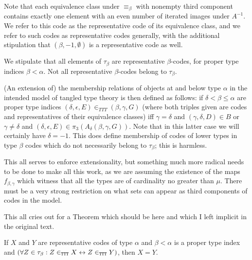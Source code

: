 \begin{definition}
\label {def:representative-code}

Note that each equivalence class under $\equiv_\beta$ with nonempty third component contains exactly one
element with an even number of iterated images under $A^{-1}$.  We refer to this code as the representative code of its equivalence class, and we refer to such codes as representative codes generally, with the additional stipulation
that $(\beta,-1,\emptyset)$ is a representative code as well.
\end{definition}

\begin{lemma}
\label {objects-are-representative}
We stipulate that all elements of $\tau_\beta$ are representative $\beta$-codes, for proper type indices $\beta<\alpha$.
Not all representative $\beta$-codes belong to $\tau_\beta$.
\end{lemma}

\begin{definition}
\label {def:ttt-membership}
(An extension of) the membership relations of objects at and below type $\alpha$ in the intended model of tangled type theory is then defined as follows: if $\delta < \beta \leq \alpha$ are proper type indices  $(\delta,\epsilon,E) \in_{TTT} (\beta,\gamma,G)$ (where both triples given are codes and representatives of their equivalence classes) iff $\gamma=\delta$ and
$(\gamma,\delta,D)  \in B$ or $\gamma\neq \delta$ and $(\delta,\epsilon,E) \in \pi_3(A_{\delta}(\beta,\gamma,G))$.  Note that in this latter case we will certainly have $\delta=-1$.  This does define membership of codes of lower types in
type $\beta$ codes which do not necessarily belong to $\tau_\beta$;  this is harmless.
\end{definition}

This all serves to enforce extensionality, but something much more radical needs to be done to make all this work, as we are assuming the existence of the maps $f_{\beta,\gamma}$ which witness that all the types are of cardinality no greater than $\mu$.  There must be a very strong restriction on what sets can appear as third components of codes in the model.

This all cries out for a Theorem which should be here and which I left implicit in the original text.

\begin{theorem}
\label {thm:extensionality}

If $X$ and $Y$ are representative codes of type $\alpha$ and $\beta<\alpha$ is a proper type index
and $(\forall Z \in \tau_\beta:Z \in_{\tt TTT} X \leftrightarrow Z \in_{\tt TTT} Y)$, then $X=Y$.

\end{theorem}

